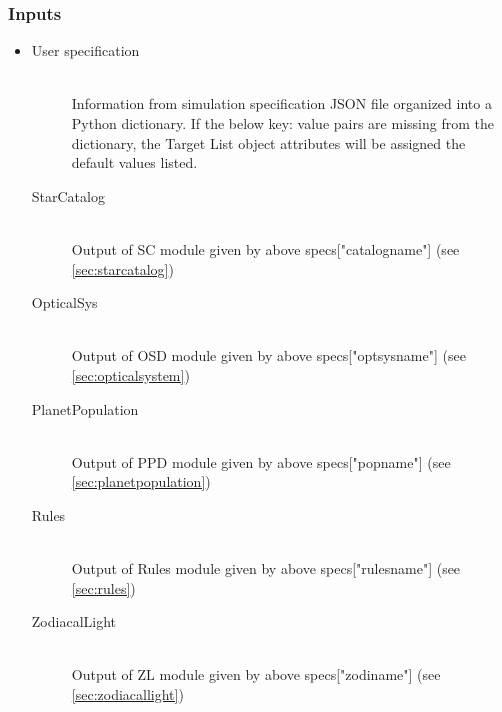 \documentclass[cleanfoot]{asme2ej}
\begin{document}
\subsubsection*{Inputs}
\begin{itemize}
    \item 
    \begin{description}
        \item[User specification] \hfill \\
        Information from simulation specification JSON file organized into a Python dictionary. If the below key: value pairs are missing from the dictionary, the Target List object attributes will be assigned the default values listed.
        \item[StarCatalog] \hfill \\
        Output of SC module given by above specs["catalogname"] (see \ref{sec:starcatalog})
        \item[OpticalSys] \hfill \\
        Output of OSD module given by above specs["optsysname"] (see \ref{sec:opticalsystem})
        \item[PlanetPopulation] \hfill \\
        Output of PPD module given by above specs["popname"] (see \ref{sec:planetpopulation})
        \item[Rules] \hfill \\
        Output of Rules module given by above specs["rulesname"] (see \ref{sec:rules})
        \item[ZodiacalLight] \hfill \\
        Output of ZL module given by above specs["zodiname"] (see \ref{sec:zodiacallight})
    \end{description}
\end{itemize}
\end{document}
